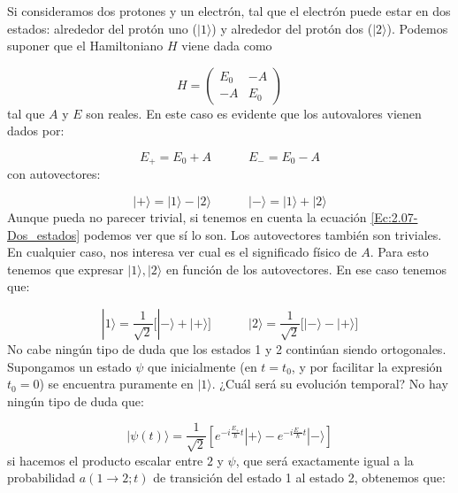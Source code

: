 \documentclass[12pt]{book}
\numberwithin{equation}{chapter}
\numberwithin{figure}{chapter}
\newcommand{\tquad}{\quad \quad \quad}
\newcommand{\ccorchetes}[1]{\left[ #1  \right]}
\begin{document}

\hrulefill

Si consideramos dos protones y un electrón, tal que el electrón puede estar en dos estados: alrededor del protón uno ($|1\rangle$) y alrededor del protón dos ($|2\rangle$). Podemos suponer que el Hamiltoniano $H$ viene dada como

\begin{equation}
H = \begin{pmatrix}
E_0 & -A \\
-A & E_0
\end{pmatrix}
\end{equation}
tal que $A$ y $E$ son reales. En este caso es evidente que los autovalores vienen dados por:

\begin{equation}
E_+ = E_0 + A  \tquad E_- = E_0 - A
\end{equation}
con autovectores:

\begin{equation}
|+\rangle = |1 \rangle - | 2 \rangle \tquad |-\rangle = | 1 \rangle + | 2 \rangle \label{Ec:2.6-Ion_Autovalores}
\end{equation}
Aunque pueda no parecer trivial, si tenemos en cuenta la ecuación \ref{Ec:2.07-Dos_estados} podemos ver que sí lo son. Los autovectores también son triviales. En cualquier caso, nos interesa ver cual es el significado físico de $A$. Para esto tenemos que expresar $|1\rangle,|2\rangle $ en función de los autovectores. En ese caso tenemos que:

\begin{equation}
|1 \rangle = \frac{1}{\sqrt{2}} \Big[    | - \rangle + |+\rangle  \Big] \tquad 
|2 \rangle = \frac{1}{\sqrt{2}} \Big[  | - \rangle - |+ \rangle \Big]
\end{equation}
No cabe ningún tipo de duda que los estados 1 y 2 continúan siendo ortogonales. Supongamos un estado $\psi$ que inicialmente (en $t=t_0$, y por facilitar la expresión $t_0=0$) se encuentra puramente en $|1\rangle$. ¿Cuál será su evolución temporal? No hay ningún tipo de duda que:

\begin{equation}
|\psi (t) \rangle = \frac{1}{\sqrt{2}} \ccorchetes{ e^{-i \frac{E_{+}}{\hbar} t } | + \rangle  -  e^{-i \frac{E_{-}}{\hbar} t } | - \rangle  } 
\end{equation} 
si hacemos el producto escalar entre $2$ y $\psi$, que será exactamente igual a la probabilidad $a(1 \rightarrow 2;t)$ de transición del estado 1 al estado 2, obtenemos que:
\end{document}
